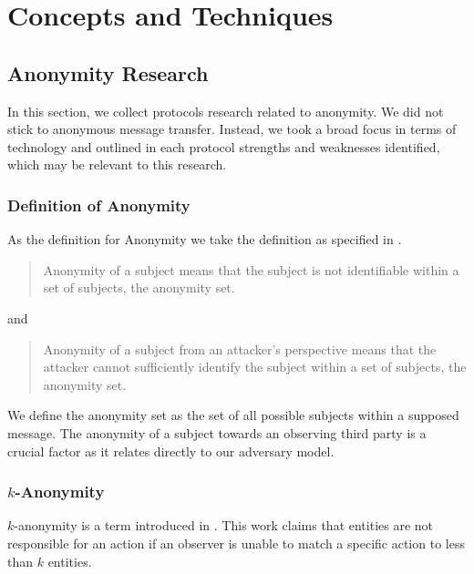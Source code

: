 
\part{Concepts and Techniques}

\chapter{Anonymity Research}
In this section, we collect protocols research related to anonymity. We did not stick to anonymous message transfer. Instead, we took a broad focus in terms of technology and outlined in each protocol strengths and weaknesses identified, which may be relevant to this research.

\section{Definition of Anonymity}
As the definition for Anonymity we take the definition as specified in \cite{anonTerminology}.
\begin{quote}
	Anonymity of a subject means that the subject is not identifiable within a set of subjects, the anonymity set.\omitted
\end{quote}
and
\begin{quote}
	Anonymity of a subject from an attacker's perspective means that the attacker cannot sufficiently identify the subject within a set of subjects, the anonymity set.\omitted
\end{quote}

We define the anonymity set as the set of all possible subjects within a supposed message. The anonymity of a subject towards an observing third party is a crucial factor as it relates directly to our adversary model.

\section{\texorpdfstring{$k$}{k}-Anonymity}
$k$-anonymity is a term introduced in \cite{k-anonymous:ccs2003}. This work claims that entities are not responsible for an action if an observer is unable to match a specific action to less than $k$ entities.

